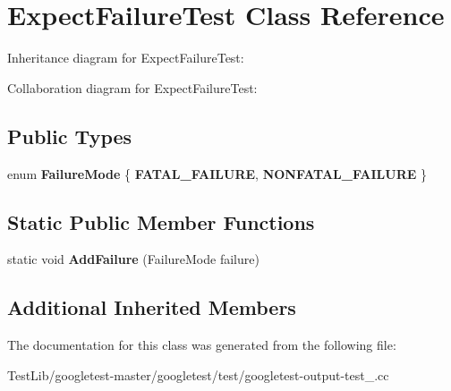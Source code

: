 \hypertarget{classExpectFailureTest}{}\section{Expect\+Failure\+Test Class Reference}
\label{classExpectFailureTest}


Inheritance diagram for Expect\+Failure\+Test\+:


Collaboration diagram for Expect\+Failure\+Test\+:
\subsection*{Public Types}
\begin{DoxyCompactItemize}
\item 
\mbox{\label{classExpectFailureTest_aad05da10bb15d21a434eba3b37011406}} 
enum {\bfseries Failure\+Mode} \{ {\bfseries F\+A\+T\+A\+L\+\_\+\+F\+A\+I\+L\+U\+RE}, 
{\bfseries N\+O\+N\+F\+A\+T\+A\+L\+\_\+\+F\+A\+I\+L\+U\+RE}
 \}
\end{DoxyCompactItemize}
\subsection*{Static Public Member Functions}
\begin{DoxyCompactItemize}
\item 
\mbox{\label{classExpectFailureTest_ab9aeb7820ff7953fc2975ecc5abd046b}} 
static void {\bfseries Add\+Failure} (Failure\+Mode failure)
\end{DoxyCompactItemize}
\subsection*{Additional Inherited Members}


The documentation for this class was generated from the following file\+:\begin{DoxyCompactItemize}
\item 
Test\+Lib/googletest-\/master/googletest/test/googletest-\/output-\/test\+\_\+.\+cc\end{DoxyCompactItemize}
